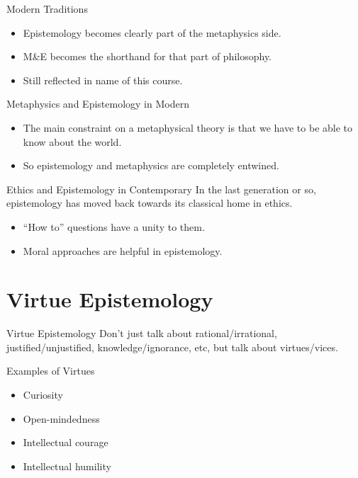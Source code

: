 \documentclass[
  17pt,
  letterpaper,
  ignorenonframetext,
  aspectratio=169,
]{beamer}
\providecommand{\tightlist}{%
  \setlength{\itemsep}{0pt}\setlength{\parskip}{0pt}}\usepackage{longtable,booktabs,array}
\begin{document}
\begin{frame}{Modern Traditions}
\protect\hypertarget{modern-traditions-1}{}
\begin{itemize}[<+->]
\tightlist
\item
  Epistemology becomes clearly part of the metaphysics side.
\item
  M\&E becomes the shorthand for that part of philosophy.
\item
  Still reflected in name of this course.
\end{itemize}
\end{frame}

\begin{frame}{Metaphysics and Epistemology in Modern}
\protect\hypertarget{metaphysics-and-epistemology-in-modern}{}
\begin{itemize}[<+->]
\tightlist
\item
  The main constraint on a metaphysical theory is that we have to be
  able to know about the world.
\item
  So epistemology and metaphysics are completely entwined.
\end{itemize}
\end{frame}

\begin{frame}{Ethics and Epistemology in Contemporary}
\protect\hypertarget{ethics-and-epistemology-in-contemporary}{}
In the last generation or so, epistemology has moved back towards its
classical home in ethics.

\begin{itemize}[<+->]
\tightlist
\item
  ``How to'' questions have a unity to them.
\item
  Moral approaches are helpful in epistemology.
\end{itemize}
\end{frame}

\hypertarget{virtue-epistemology}{%
\section{Virtue Epistemology}\label{virtue-epistemology}}

\begin{frame}{Virtue Epistemology}
\protect\hypertarget{virtue-epistemology-1}{}
Don't just talk about rational/irrational, justified/unjustified,
knowledge/ignorance, etc, but talk about virtues/vices.
\end{frame}

\begin{frame}{Examples of Virtues}
\protect\hypertarget{examples-of-virtues}{}
\begin{itemize}[<+->]
\tightlist
\item
  Curiosity
\item
  Open-mindedness
\item
  Intellectual courage
\item
  Intellectual humility
\end{itemize}
\end{frame}
\end{document}
